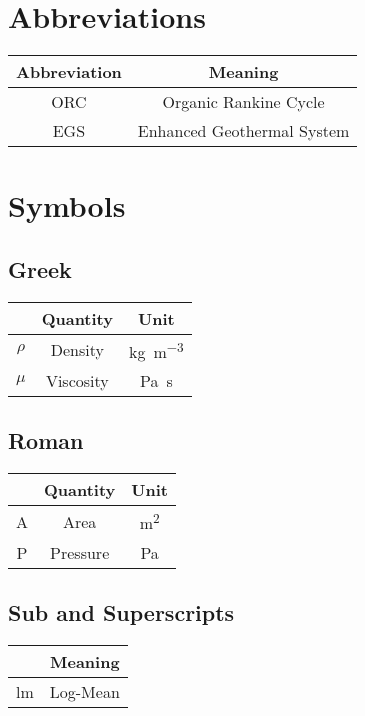 \section*{Abbreviations}\label{sec:abbreviations}
    \begin{table}[ht]
        \centering
        \begin{tabular}{c|c}
            Abbreviation & Meaning \\
            \hline
            ORC & Organic Rankine Cycle \\
            EGS & Enhanced Geothermal System 
        \end{tabular}
    \end{table}
\clearpage

\section*{Symbols}\label{sec:symbols}
    \subsection*{Greek}\label{sec:symbols_greek}
        \begin{table}[ht]
            \centering
            \begin{tabular}{c|c|c}
                & Quantity & Unit \\
                \hline
                $\rho$ & Density & \unit{\kilo\gram\per\cubic\metre} \\
                $\mu$ & Viscosity & \unit{\pascal\second}
            \end{tabular}
        \end{table}
        
    
    \subsection*{Roman}\label{sec:symbols_roman}
        \begin{table}[ht]
            \centering
            \begin{tabular}{c|c|c}
                & Quantity & Unit \\
                \hline
                A & Area & \unit{\square\metre} \\
                P & Pressure & \unit{\pascal}
            \end{tabular}
        \end{table}
    
    
    \subsection*{Sub\- and Superscripts}\label{sec:symbols_scripts}
        \begin{table}[ht]
            \centering
            \begin{tabular}{c|c}
                 & Meaning \\
                \hline
                lm & Log-Mean
            \end{tabular}
        \end{table}
\clearpage

